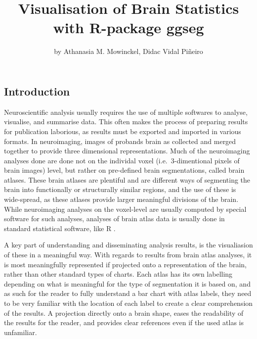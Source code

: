 \title{Visualisation of Brain Statistics with R-package ggseg}
\author{by Athanasia M. Mowinckel, Didac Vidal Piñeiro}

\maketitle



\hypertarget{introduction}{%
\subsection{Introduction}\label{introduction}}

Neuroscientific analysis usually requires the use of multiple softwares
to analyse, visualise, and summarise data. This often makes the process
of preparing results for publication laborious, as results must be
exported and imported in various formats. In neuroimaging, images of
probands brain as collected and merged together to provide three
dimensional representations. Much of the neuroimaging analyses done are
done not on the individal voxel (i.e.~3-dimentional pixels of brain
images) level, but rather on pre-defined brain segmentations, called
brain atlases. These brain atlases are plentiful and are different ways
of segmenting the brain into functionally or structurally similar
regions, and the use of these is wide-spread, as these atlases provide
larger meaningful divisions of the brain. While neuroimaging analyses on
the voxel-level are usually computed by special software for such
analyses, analyses of brain atlas data is usually done in standard
statistical software, like R \citep{R}.

A key part of understanding and disseminating analysis results, is the
visualiasion of these in a meaningful way. With regards to results from
brain atlas analyses, it is most meaningfully represented if projected
onto a representation of the brain, rather than other standard types of
charts. Each atlas has its own labelling depending on what is meaningful
for the type of segmentation it is based on, and as such for the reader
to fully understand a bar chart with atlas labels, they need to be very
familiar with the location of each label to create a clear comprehension
of the results. A projection directly onto a brain shape, eases the
readability of the results for the reader, and provides clear references
even if the used atlas is unfamiliar.

